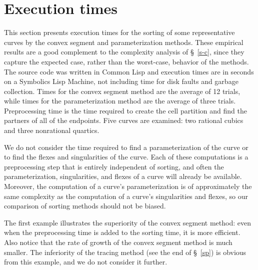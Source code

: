 \section{Execution times}
\label{data}
This section presents execution times for the sorting of some representative
curves by the convex segment and parameterization methods.
These empirical results are a good complement to the complexity analysis 
of \S~\ref{s-c}, since they capture the expected case, rather than 
the worst-case, behavior of the methods.
The source code was written in Common Lisp and
execution times are in seconds on a Symbolics Lisp Machine, 
not including time for disk faults and garbage collection.
Times for the convex segment method are the average of 12 trials, 
while times for the parameterization method are the average of three trials.
Preprocessing time is the time required to create the cell partition 
and find the partners of all of the endpoints.
Five curves are examined: two rational cubics and three nonrational quartics.

We do not consider the time required to find a parameterization of the
curve or to find the flexes and singularities of the curve.
Each of these computations is a preprocessing step that is 
entirely independent of sorting, and often the parameterization, singularities, 
and flexes of a curve will already be available.
Moreover, the computation of a curve's parameterization is of approximately the same
complexity as the computation of a curve's singularities and flexes,
so our comparison of sorting methods should not be biased.

The first example illustrates the superiority of the convex segment method:
even when the preprocessing time is added to the sorting time, it is more efficient.
Also notice that the rate of growth of the convex segment method is much smaller.
The inferiority of the tracing method (see the end of \S~\ref{sp})
is obvious from this example, and we do not consider it further.

\vspace{.2in}

